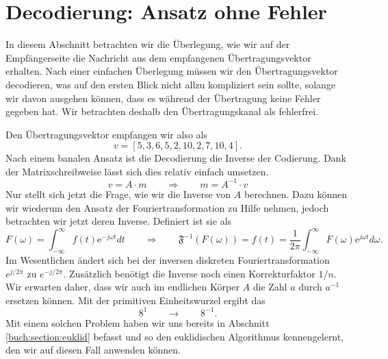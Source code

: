 %
%
%
\section{Decodierung: Ansatz ohne Fehler
\label{reedsolomon:section:decohnefehler}}

In diesem Abschnitt betrachten wir die Überlegung, wie wir auf der Empfängerseite die Nachricht aus dem empfangenen Übertragungsvektor erhalten. Nach einer einfachen Überlegung müssen wir den Übertragungsvektor decodieren, was auf den ersten Blick nicht allzu kompliziert sein sollte, solange wir davon ausgehen können, dass es während der Übertragung keine Fehler gegeben hat. Wir betrachten deshalb den Übertragungskanal als fehlerfrei.

Den Übertragungsvektor empfangen wir also als
\[
v = [5,3,6,5,2,10,2,7,10,4].
\]
Nach einem banalen Ansatz ist die Decodierung die Inverse der Codierung. Dank der Matrixschreibweise lässt sich dies relativ einfach umsetzen.
\[
v = A \cdot m \qquad \Rightarrow \qquad m = A^{-1} \cdot v
\]
Nur stellt sich jetzt die Frage, wie wir die Inverse von $A$ berechnen.
Dazu können wir wiederum den Ansatz der Fouriertransformation zu Hilfe nehmen,
jedoch betrachten wir jetzt deren Inverse.
Definiert ist sie als
\[
F(\omega) = \int_{-\infty}^{\infty} f(t) \mathrm{e}^{-j\omega t} dt \qquad \Rightarrow \qquad \mathfrak{F}^{-1}(F(\omega)) = f(t) = \frac{1}{2 \pi} \int_{-\infty}^{\infty} F(\omega) \mathrm{e}^{j \omega t} d\omega.
\]
Im Wesentlichen ändert sich bei der inversen diskreten Fouriertransformation $e^{j/2\pi}$ zu $e^{-j/2\pi}$. Zusätzlich benötigt die Inverse noch einen Korrekturfaktor $1/n$. Wir erwarten daher, dass wir auch im endlichen Körper $A$ die Zahl $a$ durch $a^{-1}$ ersetzen können. Mit der primitiven Einheitswurzel ergibt das 
%
\[
8^1 \qquad \rightarrow \qquad 8^{-1}.
\]
Mit einem solchen Problem haben wir uns bereits in Abschnitt \ref{buch:section:euklid} befasst und so den euklidischen Algorithmus kennengelernt, den wir auf diesen Fall anwenden können.

